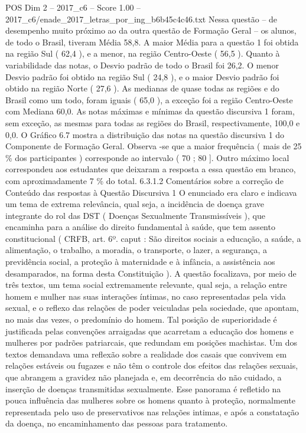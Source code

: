 \begin{textsample}{POS Dim 2 – 2017\_c6 – Score 1.00 – 2017\_c6/enade\_2017\_letras\_por\_ing\_b6b45c4c46.txt}
Nessa questão – de desempenho muito próximo ao da outra questão de Formação Geral – os alunos, de todo o Brasil, tiveram Média 58,8.
A maior Média para a questão 1 foi obtida na região Sul ( 62,4 ), e a menor, na região Centro-Oeste ( 56,5 ).
Quanto à variabilidade das notas, o Desvio padrão de todo o Brasil foi 26,2.
O menor Desvio padrão foi obtido na região Sul ( 24,8 ), e o maior Desvio padrão foi obtido na região Norte ( 27,6 ).
As medianas de quase todas as regiões e do Brasil como um todo, foram iguais ( 65,0 ), a exceção foi a região Centro-Oeste com Mediana 60,0.
As notas máximas e mínimas da questão discursiva 1 foram, sem exceção, as mesmas para todas as regiões do Brasil, respectivamente, 100,0 e 0,0.
O Gráfico 6.7 mostra a distribuição das notas na questão discursiva 1 do Componente de Formação Geral.
Observa -se que a maior frequência ( mais de 25 \% dos participantes ) corresponde ao intervalo ( 70 ; 80 ].
Outro máximo local correspondeu aos estudantes que deixaram a resposta a essa questão em branco, com aproximadamente 7 \% do total. 6.3.1.2 Comentários sobre a correção de Conteúdo das respostas à Questão Discursiva 1 O enunciado era claro e indicava um tema de extrema relevância, qual seja, a incidência de doença grave integrante do rol das DST ( Doenças Sexualmente Transmissíveis ), que encaminha para a análise do direito fundamental à saúde, que tem assento constitucional ( CRFB, art. 6º. caput : São direitos sociais a educação, a saúde, a alimentação, o trabalho, a moradia, o transporte, o lazer, a segurança, a previdência social, a proteção à maternidade e à infância, a assistência aos desamparados, na forma desta Constituição ).
A questão focalizava, por meio de três textos, um tema social extremamente relevante, qual seja, a relação entre homem e mulher nas suas interações íntimas, no caso representadas pela vida sexual, e o reflexo das relações de poder veiculadas pela sociedade, que apontam, no mais das vezes, o predomínio do homem.
Tal posição de superioridade é justificada pelas convenções arraigadas que acarretam a educação dos homens e mulheres por padrões patriarcais, que redundam em posições machistas.
Um dos textos demandava uma reflexão sobre a realidade dos casais que convivem em relações estáveis ou fugazes e não têm o controle dos efeitos das relações sexuais, que abrangem a gravidez não planejada e, em decorrência do não cuidado, a inserção de doenças transmitidas sexualmente.
Esse panorama é refletido na pouca influência das mulheres sobre os homens quanto à proteção, normalmente representada pelo uso de preservativos nas relações intimas, e após a constatação da doença, no encaminhamento das pessoas para tratamento.

\end{textsample}
